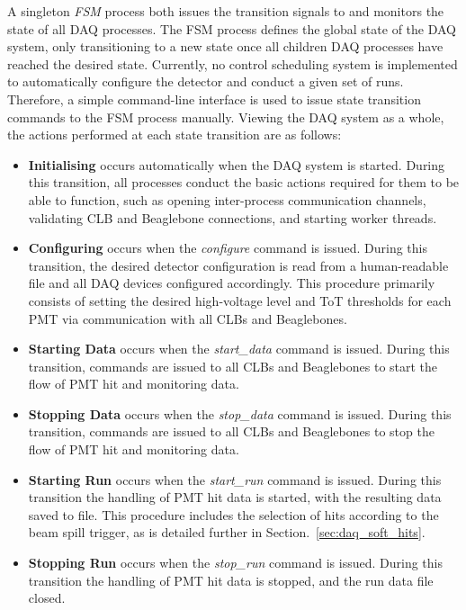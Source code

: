 A singleton \emph{FSM} process both issues the transition signals to and monitors the state of all
DAQ processes. The FSM process defines the global state of the DAQ system, only transitioning to a
new state once all children DAQ processes have reached the desired state. Currently, no control
scheduling system is implemented to automatically configure the detector and conduct a given set
of runs. Therefore, a simple command-line interface is used to issue state transition commands to
the FSM process manually. Viewing the DAQ system as a whole, the actions performed at each state
transition are as follows:
\begin{itemize}
    \item \textbf{Initialising} occurs automatically when the DAQ system is started. During this
    transition, all processes conduct the basic actions required for them to be able to function,
    such as opening inter-process communication channels, validating CLB and Beaglebone
    connections, and starting worker threads.
    \item \textbf{Configuring} occurs when the \emph{configure} command is issued. During this
    transition, the desired detector configuration is read from a human-readable file and all DAQ
    devices configured accordingly. This procedure primarily consists of setting the desired
    high-voltage level and ToT thresholds for each PMT via communication with all CLBs and
    Beaglebones.
    \item \textbf{Starting Data} occurs when the \emph{start\_data} command is issued. During this
    transition, commands are issued to all CLBs and Beaglebones to start the flow of PMT hit and
    monitoring data.
    \item \textbf{Stopping Data} occurs when the \emph{stop\_data} command is issued. During this
    transition, commands are issued to all CLBs and Beaglebones to stop the flow of PMT hit and
    monitoring data.
    \item \textbf{Starting Run} occurs when the \emph{start\_run} command is issued. During this
    transition the handling of PMT hit data is started, with the resulting data saved to file.
    This procedure includes the selection of hits according to the \numi beam spill trigger, as is
    detailed further in Section.~\ref{sec:daq_soft_hits}.
    \item \textbf{Stopping Run} occurs when the \emph{stop\_run} command is issued. During this
    transition the handling of PMT hit data is stopped, and the run data file closed.
\end{itemize}

